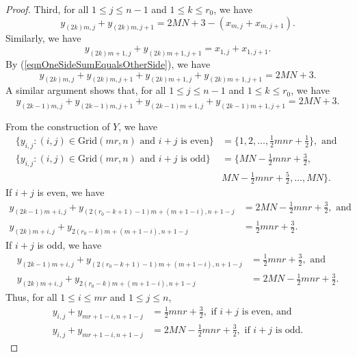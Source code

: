 \documentclass[12pt]{amsart}
\theoremstyle{definition}
\theoremstyle{plain}
\begin{document}
\begin{proof}
  Third, for all $1 \leqslant j \leqslant n-1$ and $1 \leqslant k \leqslant r_0$, we have
  \begin{equation*}
     y_{(2k)m,j} + y_{(2k)m,j+1}  = 2MN+3 -( x_{m,j} + x_{m,j+1} ).
  \end{equation*}
  Similarly, we have
  \begin{equation*}
     y_{(2k)m+1,j} + y_{(2k)m+1,j+1}  =  x_{1,j} + x_{1,j+1}.
  \end{equation*}
  By (\ref{eqnOneSideSumEqualsOtherSide}), we have
  \begin{equation*}
      y_{(2k)m,j} + y_{(2k)m,j+1} + y_{(2k)m+1,j} + y_{(2k)m+1,j+1}  =  2MN+3.
  \end{equation*}
  A similar argument shows that, for all $1 \leqslant j \leqslant n-1$ and $1 \leqslant k \leqslant r_0$, we have
  \begin{equation*}
      y_{(2k-1)m,j} + y_{(2k-1)m,j+1} + y_{(2k-1)m+1,j} + y_{(2k-1)m+1,j+1}  =  2MN+3.
  \end{equation*}

  From the construction of $Y$, we have
  \begin{align*}
    \{ y_{i,j} : (i,j) \in \mathrm{Grid}(mr,n) \mbox{ and } i+j \mbox{ is even}\} &= \{ 1,2,\ldots,\tfrac{1}{2}mnr+\tfrac{1}{2}\}, \mbox{ and } \\
    \{ y_{i,j} : (i,j) \in \mathrm{Grid}(mr,n) \mbox{ and } i+j \mbox{ is odd}\} &= \{ MN- \tfrac{1}{2}mnr + \tfrac{3}{2}, \\
    &MN- \tfrac{1}{2}mnr + \tfrac{5}{2}, \allowbreak \ldots,MN\}.
  \end{align*}
   If $i+j$ is even, we have
   \begin{align*}
     y_{(2k-1)m+i,j} + y_{(2(r_0-k+1)-1)m +(m+1-i),n+1-j} &= 2MN -\tfrac{1}{2} mnr +\tfrac{3}{2}, \mbox{ \ and } \\
     y_{(2k)m+i,j} + y_{2(r_0-k)m +(m+1-i),n+1-j}  &= \tfrac{1}{2} mnr +\tfrac{3}{2}.
   \end{align*}
   If $i+j$ is odd, we have
   \begin{align*}
     y_{(2k-1)m+i,j} + y_{(2(r_0-k+1)-1)m +(m+1-i),n+1-j}  &= \tfrac{1}{2} mnr +\tfrac{3}{2}, \mbox{ \ and }  \\
      y_{(2k)m+i,j} + y_{2(r_0-k)m +(m+1-i),n+1-j} &= 2MN -\tfrac{1}{2} mnr +\tfrac{3}{2}.
   \end{align*}
   Thus, for all $1 \leqslant i \leqslant mr$ and $1 \leqslant j \leqslant n$,
   \begin{align*}
     y_{i,j} + y_{mr+1-i,n+1-j} &= \tfrac{1}{2} mnr +\tfrac{3}{2}, \mbox{ \ if } i+j \mbox{ is even, and} \\
     y_{i,j} + y_{mr+1-i,n+1-j} &= 2MN -\tfrac{1}{2} mnr +\tfrac{3}{2}, \mbox{ \ if } i+j \mbox{ is odd.}
   \end{align*}


\end{proof}
\end{document}
